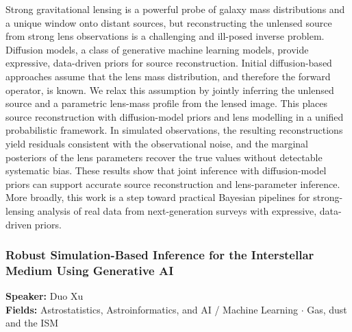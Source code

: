 Strong gravitational lensing is a powerful probe of galaxy mass distributions and a unique window onto distant sources, but reconstructing the unlensed source from strong lens observations is a challenging and ill-posed inverse problem. Diffusion models, a class of generative machine learning models, provide expressive, data-driven priors for source reconstruction. Initial diffusion-based approaches assume that the lens mass distribution, and therefore the forward operator, is known. We relax this assumption by jointly inferring the unlensed source and a parametric lens-mass profile from the lensed image. This places source reconstruction with diffusion-model priors and lens modelling in a unified probabilistic framework. In simulated observations, the resulting reconstructions yield residuals consistent with the observational noise, and the marginal posteriors of the lens parameters recover the true values without detectable systematic bias. These results show that joint inference with diffusion-model priors can support accurate source reconstruction and lens-parameter inference. More broadly, this work is a step toward practical Bayesian pipelines for strong-lensing analysis of real data from next-generation surveys with expressive, data-driven priors.



\hypertarget{abstract-talk-35}{}\label{abstract-page-talk-35}
\subsubsection*{Robust Simulation-Based Inference for the Interstellar Medium Using Generative AI}
\textbf{Speaker:} Duo Xu\\
\textbf{Fields:} Astrostatistics, Astroinformatics, and AI / Machine Learning $\cdot$ Gas, dust and the ISM

